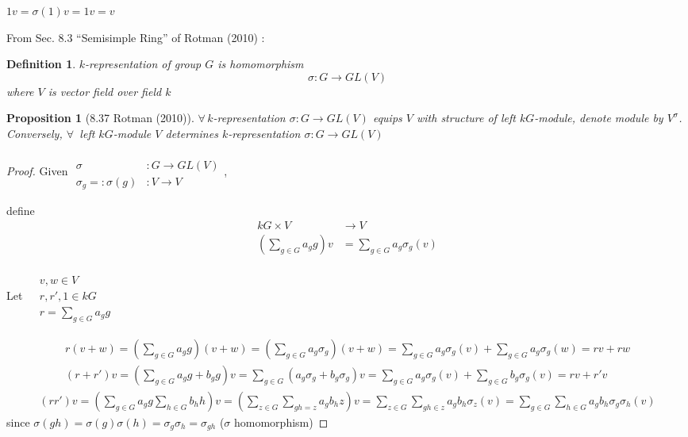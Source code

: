 \documentclass[10pt]{amsart}
\newtheorem{proposition}{Proposition}
\newtheorem{definition}{Definition}
\begin{document}
\begin{multicols*}{2}
$1v = \sigma(1) v = 1v = v$



From Sec. 8.3 ``Semisimple Ring'' of Rotman (2010) \cite{JRotman2010}:

\begin{definition}
  $k$-representation of group $G$ is homomorphism
\[
\sigma : G \to GL(V)
\]
where $V$ is vector field over field $k$
\end{definition}

\begin{proposition}[8.37 Rotman (2010)\cite{JRotman2010}]\label{Prop:Rotman8.37}
  $\forall \, k$-representation $\sigma : G \to GL(V)$ equips $V$ with structure of left $kG$-module, denote module by $V^{\sigma}$.  \\
Conversely, $\forall \, $ left $kG$-module $V$ determines $k$-representation $\sigma:G \to GL(V)$
\end{proposition}

\begin{proof}
  Given $\begin{aligned} & \quad \\
     \sigma & :G \to GL(V) \\
     \sigma_g =: \sigma(g) & : V \to V \end{aligned}$, 

define 
\[
\begin{aligned}
  kG \times V & \to V \\ 
  \left( \sum_{g\in G} a_g g \right) v & = \sum_{g\in G} a_g \sigma_g(v) 
\end{aligned}
\]

Let $\begin{aligned} & \quad \\ 
  & v,w \in V \\
  & r,r',1 \in kG \\
  & r = \sum_{g\in G} a_g g \end{aligned}$

\[
\begin{gathered}
  r(v+w) = \left( \sum_{g\in G} a_g g \right)(v+w) = \left( \sum_{g \in G} a_g \sigma_g \right)(v+w) = \sum_{g\in G} a_g \sigma_g(v) + \sum_{g\in G} a_g \sigma_g(w) = rv + rw \\ 
  (r+r')v = \left( \sum_{g\in G} a_g g + b_g g \right) v =\sum_{g\in G} (a_g \sigma_g + b_g \sigma_g ) v = \sum_{g \in G}a_g \sigma_g(v) + \sum_{g\in G}b_g \sigma_g(v) = rv + r'v 
\end{gathered}
\]
\[
\begin{gathered}
  (rr')v = \left( \sum_{g\in G} a_g g \sum_{h \in G} b_h h \right)v = \left( \sum_{z\in G} \sum_{gh = z} a_g b_h z \right) v = \sum_{z\in G} \sum_{gh \in z} a_g b_h \sigma_z(v) = \sum_{g\in G} \sum_{h \in G} a_g b_h \sigma_g \sigma_h (v)
\end{gathered}
\]
since $\sigma(gh) = \sigma(g) \sigma(h) = \sigma_g \sigma_h = \sigma_{gh}$ ($\sigma$ homomorphism)


\end{proof}
\end{multicols*}
\end{document}
